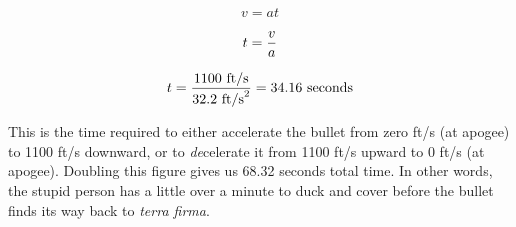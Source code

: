 $$v = a t$$

$$t = {v \over a}$$

$$t = {1100 \hbox{ ft/s} \over 32.2 \hbox{ ft/s}^2} = 34.16 \hbox{ seconds}$$

This is the time required to either accelerate the bullet from zero ft/s (at apogee) to 1100 ft/s downward, or to {\it de}celerate it from 1100 ft/s upward to 0 ft/s (at apogee).  Doubling this figure gives us 68.32 seconds total time.  In other words, the stupid person has a little over a minute to duck and cover before the bullet finds its way back to {\it terra firma}.











